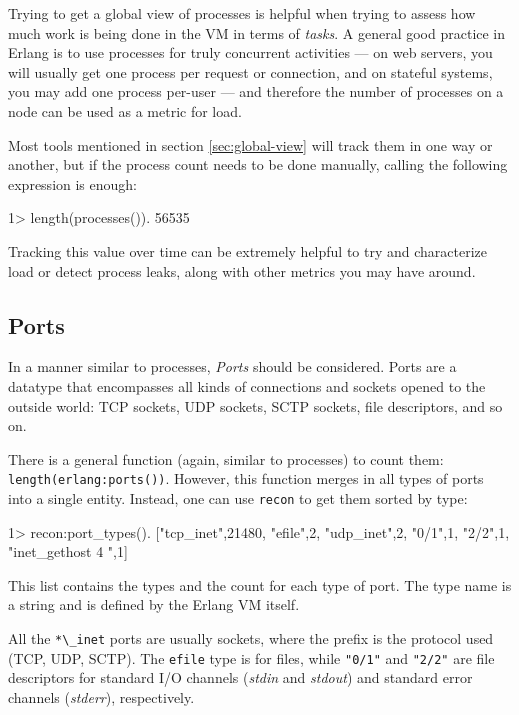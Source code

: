 \documentclass[11pt, oneside]{book}   	%
\newcommand{\otpapp}[1]{\Verb`#1`}
\newcommand{\expression}[1]{\Verb`#1`}
\begin{document}
Trying to get a global view of processes is helpful when trying to assess how much work is being done in the VM in terms of \emph{tasks}. A general good practice in Erlang is to use processes for truly concurrent activities — on web servers, you will usually get one process per request or connection, and on stateful systems, you may add one process per-user — and therefore the number of processes on a node can be used as a metric for load.

Most tools mentioned in section \ref{sec:global-view} will track them in one way or another, but if the process count needs to be done manually, calling the following expression is enough:

\begin{VerbatimEshell}
1> length(processes()).
56535
\end{VerbatimEshell}

Tracking this value over time can be extremely helpful to try and characterize load or detect process leaks, along with other metrics you may have around.

\subsection{Ports}
\label{subsec:global-ports}

In a manner similar to processes, \emph{Ports} should be considered. Ports are a datatype that encompasses all kinds of connections and sockets opened to the outside world: TCP sockets, UDP sockets, SCTP sockets, file descriptors, and so on.

There is a general function (again, similar to processes) to count them: \expression{length(erlang:ports())}. However, this function merges in all types of ports into a single entity. Instead, one can use \otpapp{recon} to get them sorted by type:

\begin{VerbatimEshell}
1> recon:port_types().
[{"tcp_inet",21480},
 {"efile",2},
 {"udp_inet",2},
 {"0/1",1},
 {"2/2",1},
 {"inet_gethost 4 ",1}]
 \end{VerbatimEshell}

This list contains the types and the count for each type of port. The type name is a string and is defined by the Erlang VM itself.

All the \expression{*\_inet} ports are usually sockets, where the prefix is the protocol used (TCP, UDP, SCTP). The \expression{efile} type is for files, while \expression{"0/1"} and \expression{"2/2"} are file descriptors for standard I/O channels (\emph{stdin} and \emph{stdout}) and standard error channels (\emph{stderr}), respectively.
\end{document}

